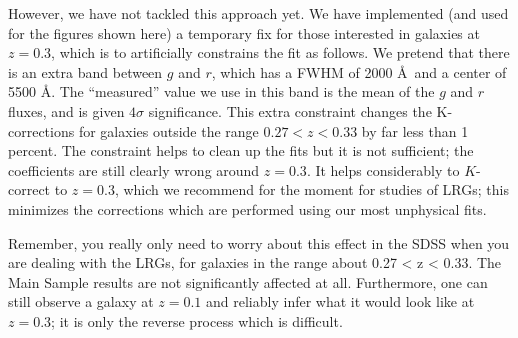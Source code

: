 \documentclass[10pt,preprint]{aastex}
\begin{document}
However, we have not tackled this approach yet. We have implemented
(and used for the figures shown here) a temporary fix for those
interested in galaxies at $z=0.3$, which is to artificially constrains
the fit as follows. We pretend that there is an extra band between $g$
and $r$, which has a FWHM of 2000 \AA\ and a center of 5500 \AA. The
``measured'' value we use in this band is the mean of the $g$ and $r$
fluxes, and is given $4\sigma$ significance. This extra constraint
changes the K-corrections for galaxies outside the range $0.27 < z <
0.33$ by far less than 1 percent. The constraint helps to clean up the
fits but it is not sufficient; the coefficients are still clearly
wrong around $z=0.3$. It helps considerably to $K$-correct to $z=0.3$,
which we recommend for the moment for studies of LRGs; this minimizes
the corrections which are performed using our most unphysical fits.

Remember, you really only need to worry about this effect in the SDSS
when you are dealing with the LRGs, for galaxies in the range about
0.27 < z < 0.33. The Main Sample results are not significantly
affected at all.  Furthermore, one can still observe a galaxy at
$z=0.1$ and reliably infer what it would look like at $z=0.3$; it is
only the reverse process which is difficult.



\end{document}
